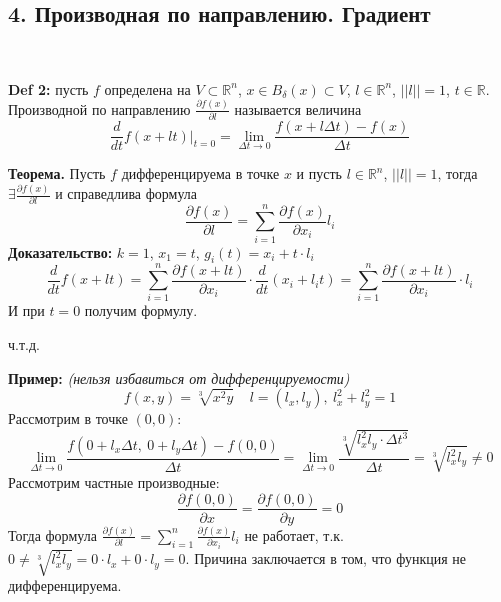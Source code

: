 \documentclass[book, 11pt]{report}
\begin{document}
        \subsection*{4. Производная по направлению. Градиент}
        \par{\ }
        \par{\textbf{Def 2: } пусть $f$ определена на $V\subset\mathbb{R}^n$, $x\in B_{\delta}(x)\subset V$, $l\in\mathbb{R}^n$, $||l||=1$, $t\in\mathbb{R}$. \\
        Производной по направлению $\frac{\partial f(x)}{\partial l}$ называется величина
        \begin{equation*}
            \frac{d}{dt}f(x+lt)\bigg|_{t=0}=\lim_{\Delta t\to0}\frac{f(x+l\Delta t)-f(x)}{\Delta t}
        \end{equation*}
        }
        \vspace{0.5cm}
        \par{\textbf{Теорема.} Пусть $f$ дифференцируема в точке $x$ и пусть $l\in\mathbb{R}^n$, $||l||=1$, тогда $\exists\frac{\partial f(x)}{\partial l}$ и справедлива формула
        \begin{equation*}
            \frac{\partial f(x)}{\partial l}=\sum_{i=1}^n\frac{\partial f(x)}{\partial x_i}l_i
        \end{equation*}
        \textbf{Доказательство: }$k=1$, $x_1=t$, $g_i(t)=x_i+t\cdot l_i$
        \begin{equation*}
            \frac{d}{dt}f(x+lt)=\sum_{i=1}^n\frac{\partial f(x+lt)}{\partial x_i}\cdot\frac{d}{dt}(x_i+l_it)=\sum_{i=1}^n\frac{\partial f(x+lt)}{\partial x_i}\cdot l_i
        \end{equation*}
        И при $t=0$ получим формулу.
        }
        \par{{\raggedleft ч.т.д.\par}}
        \noindent\hrulefill\noindent
        \par{\textbf{Пример:} \textit{(нельзя избавиться от дифференцируемости)} \\
        \begin{equation*}
            f(x,y)=\sqrt[3]{x^2y} \ \ \ \ \ l=(l_x,l_y), \ l_x^2+l_y^2=1
        \end{equation*}
        Рассмотрим в точке $(0,0)$:
        \begin{equation*}
            \lim_{\Delta t\to0}\frac{f(0+l_x\Delta t, \ 0+l_y\Delta t)-f(0,0)}{\Delta t}=\lim_{\Delta t\to0}\frac{\sqrt[3]{l_x^2l_y\cdot\Delta t^3}}{\Delta t}=\sqrt[3]{l_x^2l_y}\neq0
        \end{equation*}
        Рассмотрим частные производные:
        \begin{equation*}
            \frac{\partial f(0,0)}{\partial x}=\frac{\partial f(0,0)}{\partial y}=0
        \end{equation*}
        Тогда формула $\displaystyle\frac{\partial f(x)}{\partial l}=\sum_{i=1}^n\frac{\partial f(x)}{\partial x_i}l_i$ не работает, т.к. $0\neq\sqrt[3]{l_x^2l_y}=0\cdot l_x+0\cdot l_y=0$. Причина заключается в том, что функция не дифференцируема.}
\end{document}
